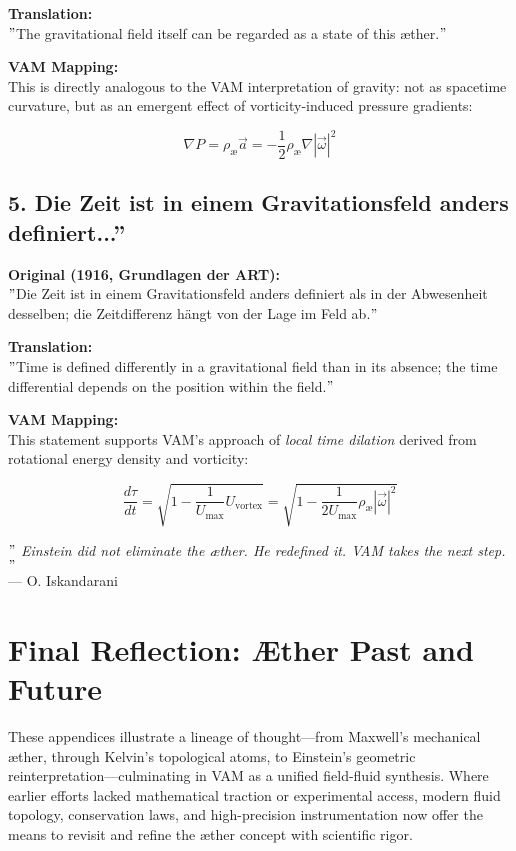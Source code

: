 \documentclass[preprint]{revtex4-2}
\begin{document}
    \textbf{Translation:} \\
    \("\)The gravitational field itself can be regarded as a state of this æther.\("\)

    \textbf{VAM Mapping:} \\
    This is directly analogous to the VAM interpretation of gravity: not as spacetime curvature, but as an emergent effect of vorticity-induced pressure gradients:

    \[
    \nabla P = \rho_\text{\ae} \vec{a} = -\frac{1}{2} \rho_\text{\ae} \nabla |\vec{\omega}|^2
    \]

    \subsection*{5. \grqq Die Zeit ist in einem Gravitationsfeld anders definiert...\textquotedblright}
    \textbf{Original (1916, Grundlagen der ART):} \\
    \("\)Die Zeit ist in einem Gravitationsfeld anders definiert als in der Abwesenheit desselben; die Zeitdifferenz hängt von der Lage im Feld ab.\("\)

    \textbf{Translation:} \\
    \("\)Time is defined differently in a gravitational field than in its absence; the time differential depends on the position within the field.\("\)

    \textbf{VAM Mapping:} \\
    This statement supports VAM's approach of \emph{local time dilation} derived from rotational energy density and vorticity:

    \[
    \frac{d\tau}{dt} = \sqrt{1 - \frac{1}{U_\text{max}} U_{\text{vortex}}} = \sqrt{1 - \frac{1}{2U_\text{max}} \rho_\text{\ae} |\vec{\omega}|^2}
    \]

    \bigskip
    \textit{ \("\) Einstein did not eliminate the æther. He redefined it. VAM takes the next step. \("\)}\\
    \hfill — O. Iskandarani\\

\section*{Final Reflection: Æther Past and Future}

These appendices illustrate a lineage of thought—from Maxwell’s mechanical æther, through Kelvin’s topological atoms, to Einstein’s geometric reinterpretation—culminating in VAM as a unified field-fluid synthesis. Where earlier efforts lacked mathematical traction or experimental access, modern fluid topology, conservation laws, and high-precision instrumentation now offer the means to revisit and refine the æther concept with scientific rigor.


    
    
\end{document}
